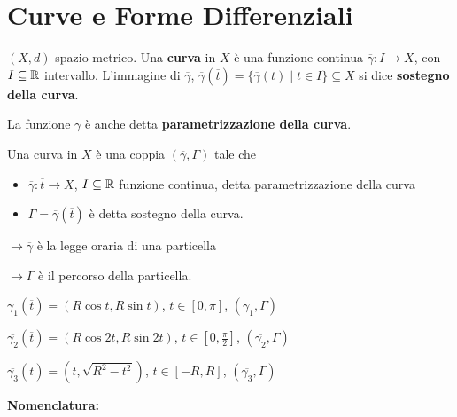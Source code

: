 \section{Curve e Forme Differenziali}

\begin{definition}
	$(X,d)$ spazio metrico. Una \textbf{curva} in $X$ è una funzione continua $\overline{\gamma}:I \rightarrow X$, con $I \subseteq \mathbb{R}$ intervallo. L'immagine di $\overline{\gamma}$, $\overline{\gamma}(\overline{t})=\{\overline{\gamma}(t)\mid t \in I \}\subseteq X$ si dice \textbf{sostegno della curva}.
		
	La funzione $\overline{\gamma}$ è anche detta \textbf{parametrizzazione della curva}.
	
	Una curva in $X$ è una coppia $(\overline{\gamma},\Gamma)$ tale che
	\begin{itemize}
		\item $\overline{\gamma}:\overline{t}\rightarrow X$, $I \subseteq \mathbb{R}$ funzione continua, detta parametrizzazione della curva
		\item $\Gamma=\overline{\gamma}(\overline{t})$ è detta sostegno della curva.
	\end{itemize}
	
	{\color{blue} 
		$\rightarrow \overline{\gamma}$ è la legge oraria di una particella
		
		$\rightarrow \Gamma$ è il percorso della particella.}
\end{definition}


\begin{exbar}
	\segnaposto %
	
	$\overline{\gamma_1}(\overline{t})=(R\cos t , R\sin t)$, $t \in [0,\pi]$, $(\overline{\gamma_1},\Gamma)$
	
	$\overline{\gamma_2}(\overline{t})=(R\cos 2t, R\sin 2t)$, $t \in [0,\frac{\pi}{2}]$, $(\overline{\gamma_2},\Gamma)$
	
	$\overline{\gamma_3}(\overline{t})=(t, \sqrt{R^2-t^2})$, $t \in [-R,R]$, $(\overline{\gamma_3},\Gamma)$
\end{exbar}



\textbf{Nomenclatura:}

